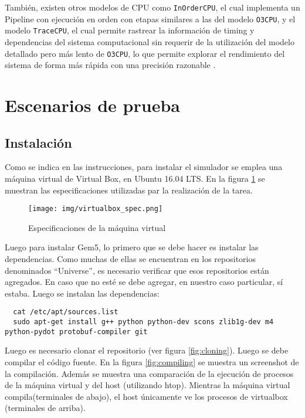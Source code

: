 \documentclass {article}
\begin{document}
También, existen otros modelos de CPU como \texttt{InOrderCPU}, el cual implementa un Pipeline con
ejecución en orden con etapas similares a las del modelo \texttt{O3CPU}, y el modelo
\texttt{TraceCPU}, el cual permite rastrear la información de timing y dependencias del sistema
computacional sin requerir de la utilización del modelo detallado pero más lento de \texttt{O3CPU},
lo que permite explorar el rendimiento del sistema de forma más rápida con una precisión razonable
\cite{***}.


\section{Escenarios de prueba}

\subsection{Instalación}
Como se indica en las instrucciones, para instalar el simulador se emplea una máquina virtual de
Virtual Box, en Ubuntu 16.04 LTS. En la figura \ref{fig:specs_vbox}
se muestran las especificaciones utilizadas par la realización de la tarea.

\begin{figure}[H]
  \centering
  \texttt{[image: img/virtualbox\_spec.png]}
  \caption{\label{fig:specs_vbox} Especificaciones de la máquina virtual}
\end{figure}
 
Luego para instalar Gem5, lo primero que se debe hacer es instalar las dependencias. Como muchas de
ellas se encuentran en los repositorios denominados “Universe”, es necesario verificar que esos
repositorios están agregados. En caso que no esté se debe agregar, en nuestro caso particular, sí estaba. Luego se instalan las dependencias:

\begin{lstlisting}
  cat /etc/apt/sources.list
  sudo apt-get install g++ python python-dev scons zlib1g-dev m4  python-pydot protobuf-compiler git
\end{lstlisting}
 
Luego es necesario clonar el repositorio (ver figura \ref{fig:cloning}). Luego se debe compilar el
código fuente. En la figura \ref{fig:compiling} se muestra un screenshot de la compilación. Además
se muestra una comparación de la ejecución de procesos de la máquina virtual y del host (utilizando
htop). Mientras la máquina virtual compila(terminales de abajo), el host únicamente ve los procesos
de virtualbox (terminales de arriba). 
\end{document}
